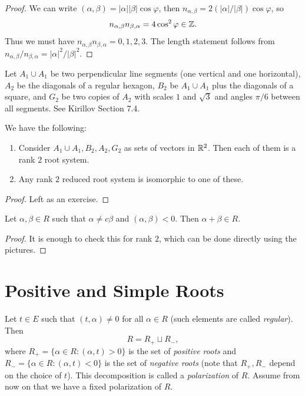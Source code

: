 \begin{proof}
  We can write $(\alpha, \beta) = |\alpha| |\beta| \cos \varphi$,
  then
  $n_{\alpha, \beta} = 2 (|\alpha| / |\beta|) \cos \varphi$, so
  \[
    n_{\alpha, \beta}
    n_{\beta, \alpha}
    = 4 \cos^2 \varphi \in \mathbb{Z}.
  \]
  Thus we must have
  $n_{\alpha, \beta} n_{\beta, \alpha} = 0, 1, 2, 3$.
  The length statement follows from
  $n_{\alpha, \beta} / n_{\beta, \alpha} = |\alpha|^2 / |\beta|^2$.
\end{proof}

\begin{example}
  Let $A_1 \cup A_1$ be two perpendicular
  line segments (one vertical and one
  horizontal), $A_2$ be the diagonals of
  a regular hexagon, $B_2$ be
  $A_1 \cup A_1$ plus the diagonals of
  a square, and $G_2$ be two copies
  of $A_2$ with scales
  $1$ and $\sqrt{3}$ and angles
  $\pi / 6$ between all segments.
  See Kirillov Section 7.4.
\end{example}

\begin{theorem}
  We have the following:
  \begin{enumerate}
    \item Consider
      $A_1 \cup A_1, B_2, A_2, G_2$
      as sets of vectors in $\mathbb{R}^2$. Then
      each of them is a rank $2$ root system.
    \item Any rank $2$ reduced root system
      is isomorphic to one of these.
  \end{enumerate}
\end{theorem}

\begin{proof}
  Left as an exercise.
\end{proof}

\begin{lemma}\label{lem:sum-roots}
  Let $\alpha, \beta \in R$ such that
  $\alpha \ne c \beta$ and
  $(\alpha, \beta) < 0$. Then
  $\alpha + \beta \in R$.
\end{lemma}

\begin{proof}
  It is enough to check this for rank
  $2$, which can be done directly using the pictures.
\end{proof}

\section{Positive and Simple Roots}

\begin{remark}
  Let $t \in E$ such that
  $(t, \alpha) \ne 0$ for all $\alpha \in R$
  (such elements are called \emph{regular}).
  Then
  \[
    R = R_+ \sqcup R_-,
  \]
  where $R_+ = \{\alpha \in R : (\alpha, t) > 0\}$
  is the set of \emph{positive roots}
  and $R_- = \{\alpha \in R : (\alpha, t) < 0\}$
  is the set of \emph{negative roots}
  (note that $R_+, R_-$ depend on the
  choice of $t$). This decomposition
  is called a \emph{polarization} of $R$.
  Assume from now on that we have a
  fixed polarization of $R$.
\end{remark}

